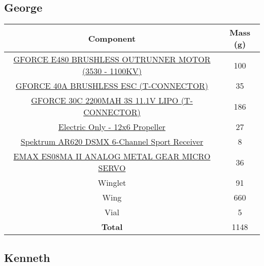     \subsection{George}
     \begin{table}[H]
        \begin{tabular}{|c|c| } %
            \hline \textbf{Component} & \textbf{Mass (g)} \\ \hline %
            \href{https://www.amazon.com/Brushless-Outrunner-Multicopters-Helicopter-Control/dp/B08MKQFSVF/ref=asc_df_B08MKQFSVF/?tag=hyprod-20&linkCode=df0&hvadid=475795164185&hvpos=&hvnetw=g&hvrand=9902342740412303481&hvpone=&hvptwo=&hvqmt=&hvdev=c&hvdvcmdl=&hvlocint=&hvlocphy=2840&hvtargid=pla-1195392311214&th=1}{GFORCE E480 BRUSHLESS OUTRUNNER MOTOR (3530 - 1100KV)} & 100 \\ \hline
            \href{http://www.valuehobby.com/gforce-40a-esc.html}{GFORCE 40A BRUSHLESS ESC (T-CONNECTOR)} & 35 \\ \hline
            \href{http://www.valuehobby.com/30c-2200mah-3s-t.html}{GFORCE 30C 2200MAH 3S 11.1V LIPO (T-CONNECTOR)} & 186 \\ \hline
            \href{https://www.masterairscrew.com/products/electric-only-12x6-propeller?currency=USD&utm_medium=cpc&utm_source=google&utm_campaign=Google\%20Shopping&gclid=CjwKCAiA9aKQBhBREiwAyGP5laqPgb8z2BGon5sD8qHYRZQVab7IcA0DZg8DOcFMsDTccBgRqirzgBoC1wkQAvD_BwE}{Electric Only - 12x6 Propeller} & 27 \\ \hline
            \href{https://www.horizonhobby.com/product/ar620-dsmx-6-channel-sport-receiver/SPMAR620.html?gclid=CjwKCAiA9aKQBhBREiwAyGP5lX6-hyQKl87DI0WH0pgWG2HS0woZKcd-L2bMRS_qWmVI1fLqpeCX0BoCrRAQAvD_BwE}{Spektrum AR620 DSMX 6-Channel Sport Receiver} & 8 \\ \hline
            \href{https://arrishobby.com/emax-es08ma-ii-12g-mini-metal-gear-analog-servo-p0842.html?VariantsId=12700}{EMAX ES08MA II ANALOG METAL GEAR MICRO SERVO} & 36 \\ \hline
            Winglet  & 91  \\ \hline
            Wing & 660 \\ \hline
            Vial & 5 \\ \hline
            \textbf{Total} & 1148 \\ \hline
        \end{tabular}
        \end{table}
    
    \subsection{Kenneth}
        
